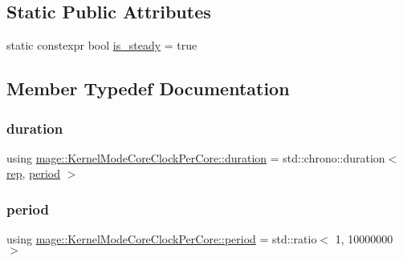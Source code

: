 \subsection*{Static Public Attributes}
\begin{DoxyCompactItemize}
\item 
static constexpr bool \hyperlink{structmage_1_1_kernel_mode_core_clock_per_core_a8b87465ab1497015a4f6436fd4637645}{is\+\_\+steady} = true
\end{DoxyCompactItemize}


\subsection{Member Typedef Documentation}
\hypertarget{structmage_1_1_kernel_mode_core_clock_per_core_ae159e34904ac66f359f0152291e8e6dc}{}\label{structmage_1_1_kernel_mode_core_clock_per_core_ae159e34904ac66f359f0152291e8e6dc} 
\subsubsection{\texorpdfstring{duration}{duration}}
{\footnotesize\ttfamily using \hyperlink{structmage_1_1_kernel_mode_core_clock_per_core_ae159e34904ac66f359f0152291e8e6dc}{mage\+::\+Kernel\+Mode\+Core\+Clock\+Per\+Core\+::duration} =  std\+::chrono\+::duration$<$ \hyperlink{structmage_1_1_kernel_mode_core_clock_per_core_a436d770fc6a86e736dda04d72402eb46}{rep}, \hyperlink{structmage_1_1_kernel_mode_core_clock_per_core_a8baf818e6d058755e971344b5c8ff659}{period} $>$}

\hypertarget{structmage_1_1_kernel_mode_core_clock_per_core_a8baf818e6d058755e971344b5c8ff659}{}\label{structmage_1_1_kernel_mode_core_clock_per_core_a8baf818e6d058755e971344b5c8ff659} 
\subsubsection{\texorpdfstring{period}{period}}
{\footnotesize\ttfamily using \hyperlink{structmage_1_1_kernel_mode_core_clock_per_core_a8baf818e6d058755e971344b5c8ff659}{mage\+::\+Kernel\+Mode\+Core\+Clock\+Per\+Core\+::period} =  std\+::ratio$<$ 1, 10\textquotesingle{}000\textquotesingle{}000 $>$}

